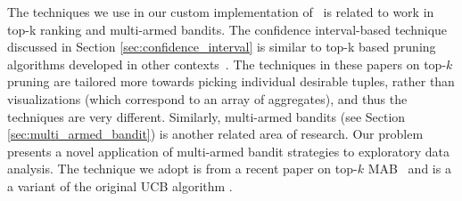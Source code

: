 The techniques we use in our custom implementation of \SeeDB\ is
related to work in top-k ranking and multi-armed bandits.
The confidence interval-based technique discussed in Section \ref{sec:confidence_interval} 
is similar to top-k based pruning algorithms developed 
in other contexts~\cite{DBLP:conf/pods/FaginLN01, 
DBLP:conf/vldb/IlyasAE04, DBLP:conf/ICDE/ReDS07}.
The techniques in these papers on top-$k$ pruning are 
tailored more towards picking individual desirable tuples,
rather than visualizations (which correspond to an array of aggregates),
and thus the techniques are very different.
Similarly, multi-armed bandits (see Section \ref{sec:multi_armed_bandit}) is another
related area of research. 
Our problem presents a novel application of multi-armed bandit strategies to 
exploratory data analysis.
The technique we adopt is from a recent paper on top-$k$ MAB~\cite{BubeckWV13,audibert2010best} and is a 
a variant of the original UCB algorithm \cite{AuerCF02, LaiR85}.
